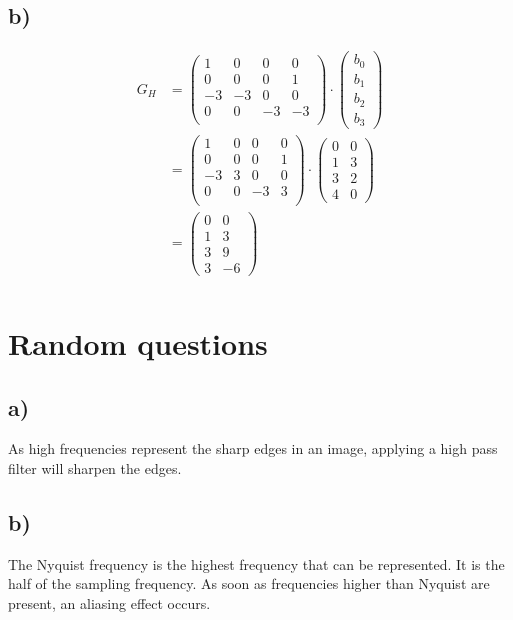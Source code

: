\documentclass[a4paper]{scrartcl}
\begin{document}
  \subsection*{b)}
    \begin{align*}
      G_H
      &= \begin{pmatrix}
        1 & 0 & 0 & 0\\
        0 & 0 & 0 & 1\\
        -3 & -3 & 0 & 0\\
        0 & 0 & -3 & -3\\
      \end{pmatrix}
      \cdot \begin{pmatrix}
        b_0\\b_1\\b_2\\b_3
      \end{pmatrix}\\
      &= \begin{pmatrix}
        1 & 0 & 0 & 0\\
        0 & 0 & 0 & 1\\
        -3 & 3 & 0 & 0\\
        0 & 0 & -3 & 3\\
      \end{pmatrix}
      \cdot \begin{pmatrix}
        0 & 0 \\ 1 & 3 \\ 3 & 2\\ 4 & 0
      \end{pmatrix}\\
      &=\begin{pmatrix}
        0 & 0 \\ 1 & 3 \\ 3 & 9 \\ 3 & -6
      \end{pmatrix}\\
    \end{align*}

\section{Random questions}
  \subsection*{a)}
    As high frequencies represent the sharp edges in an image, applying a high
    pass filter will sharpen the edges.

  \subsection*{b)}
    The Nyquist frequency is the highest frequency that can be represented. It
    is the half of the sampling frequency. As soon as frequencies higher than
    Nyquist are present, an aliasing effect occurs.
    
\end{document}
